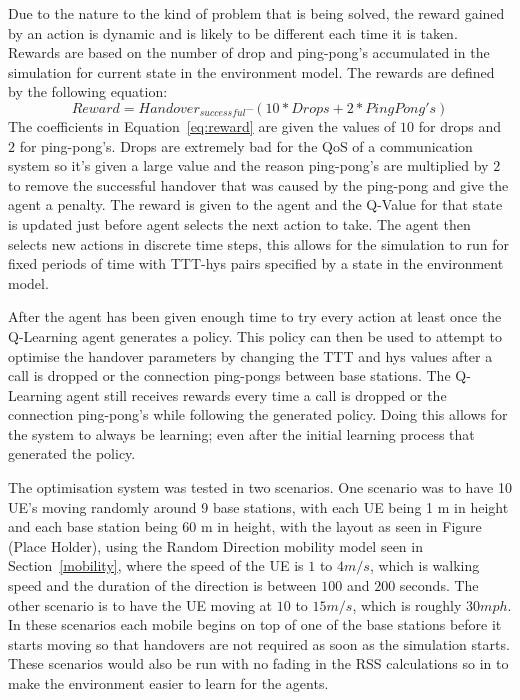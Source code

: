 Due to the nature to the kind of problem that is being solved, the reward gained by an action is dynamic and is likely to be different each time it is taken. Rewards are based on the number of drop and ping-pong's accumulated in the simulation for current state in the environment model. The rewards are defined by the following equation:
\begin{equation}\label{eq:reward}
Reward = Handover_{successful} – (10*Drops + 2*PingPong's)
\end{equation}
The coefficients in Equation~\ref{eq:reward} are given the values of $10$ for drops and $2$ for ping-pong's. Drops are extremely bad for the QoS of a communication system so it's given a large value and the reason ping-pong's are multiplied by $2$ to remove the successful handover that was caused by the ping-pong and give the agent a penalty. The reward is given to the agent and the Q-Value for that state is updated just before agent selects the next action to take.  The agent then selects new actions in discrete time steps, this allows for the simulation to run for fixed periods of time with TTT-hys pairs specified by a state in the environment model. 

After the agent has been given enough time to try every action at least once the Q-Learning agent generates a policy. This policy can then be used to attempt to optimise the handover parameters by changing the TTT and hys values after a call is dropped or the connection ping-pongs between base stations. The Q-Learning agent still receives rewards every time a call is dropped or the connection ping-pong's while following the generated policy. Doing this allows for the system to always be learning; even after the initial learning process that generated the policy.

The optimisation system was tested in two scenarios. One scenario was to have 10 UE's moving randomly around 9 base stations, with each UE being 1 m in height and each base station being 60 m in height, with the layout as seen in Figure (Place Holder), using the Random Direction mobility model seen in Section~\ref{mobility}, where the speed of the UE is $1$ to $4 m/s$, which is walking speed and the duration of the direction is between $100$ and $200$ seconds. The other scenario is to have the UE moving at $10$ to $15 m/s$, which is roughly $30 mph$. In these scenarios each mobile begins on top of one of the base stations before it starts moving so that handovers are not required as soon as the simulation starts. These scenarios would also be run with no fading in the RSS calculations so in to make the environment easier to learn for the agents.


